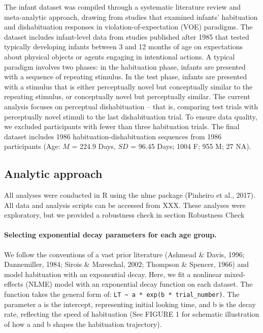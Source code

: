 \documentclass[10pt, letterpaper]{article}
\begin{document}
The infant dataset was compiled through a systematic literature review
and meta-analytic approach, drawing from studies that examined infants'
habituation and dishabituation responses in violation-of-expectation
(VOE) paradigms. The dataset includes infant-level data from studies
published after 1985 that tested typically developing infants between 3
and 12 months of age on expectations about physical objects or agents
engaging in intentional actions. A typical paradigm involves two phases:
in the habituation phase, infants are presented with a sequence of
repeating stimulus. In the test phase, infants are presented with a
stimulus that is either perceptually novel but conceptually similar to
the repeating stimulus, or conceptually novel but perceptually similar.
The current analysis focuses on perceptual dishabituation -- that is,
comparing test trials with perceptually novel stimuli to the last
dishabituation trial. To ensure data quality, we excluded participants
with fewer than three habituation trials. The final dataset includes
1986 habituation-dishabituation sequences from 1986 participants (Age:
\(M\) = 224.9 Days, \(SD\) = 96.45 Days; 1004 F; 955 M; 27 NA).

\hypertarget{analytic-approach}{%
\subsection{Analytic approach}\label{analytic-approach}}

All analyses were conducted in R using the nlme package (Pinheiro et
al., 2017). All data and analysis scripts can be accessed from XXX.
These analyses were exploratory, but we provided a robustness check in
section Robustness Check

\hypertarget{selecting-exponential-decay-parameters-for-each-age-group.}{%
\paragraph{Selecting exponential decay parameters for each age
group.}\label{selecting-exponential-decay-parameters-for-each-age-group.}}

We follow the conventions of a vast prior literature (Ashmead \& Davis,
1996; Dannemiller, 1984; Sirois \& Mareschal, 2002; Thompson \& Spencer,
1966) and model habituation with an exponential decay. Here, we fit a
nonlinear mixed-effects (NLME) model with an exponential decay function
on each dataset. The function takes the general form of:
\texttt{LT\ \textasciitilde{}\ a\ *\ exp(b\ *\ trial\_number)}. The
parameter a is the intercept, representing initial looking time, and b
is the decay rate, reflecting the speed of habituation (See FIGURE 1 for
schematic illustration of how a and b shapes the habituation
trajectory).
\end{document}
